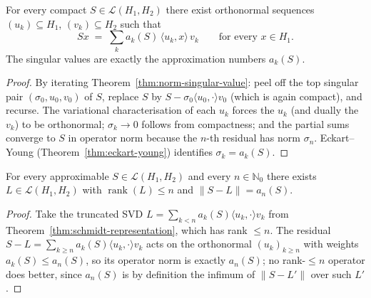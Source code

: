 \begin{theorem}
\label{thm:schmidt-representation}
\leanok
{}
For every compact $S \in \mathcal{L}(H_1, H_2)$ there exist
orthonormal sequences $(u_k) \subseteq H_1$, $(v_k) \subseteq H_2$ such
that
\[
  S x \;=\; \sum_{k} a_k(S) \, \langle u_k, x \rangle \, v_k
  \qquad \text{for every } x \in H_1.
\]
The singular values are exactly the approximation numbers $a_k(S)$.
\end{theorem}
\begin{proof}
\leanok
{}
By iterating Theorem~\ref{thm:norm-singular-value}: peel off the top
singular pair $(\sigma_0, u_0, v_0)$ of $S$, replace $S$ by
$S - \sigma_0 \langle u_0, \cdot\rangle v_0$ (which is again compact), and
recurse. The variational characterisation of each $u_k$ forces the $u_k$
(and dually the $v_k$) to be orthonormal; $\sigma_k \to 0$ follows from
compactness; and the partial sums converge to $S$ in operator norm because
the $n$-th residual has norm $\sigma_n$. Eckart--Young
(Theorem~\ref{thm:eckart-young}) identifies $\sigma_k = a_k(S)$.
\end{proof}

\begin{theorem}
\label{thm:eckart-young}
\leanok
{}
For every approximable $S \in \mathcal{L}(H_1, H_2)$ and every
$n \in \mathbb{N}_0$ there exists $L \in \mathcal{L}(H_1, H_2)$ with
$\operatorname{rank}(L) \le n$ and $\|S - L\| = a_n(S)$.
\end{theorem}
\begin{proof}
\leanok
{}
Take the truncated SVD $L = \sum_{k < n} a_k(S)\langle u_k, \cdot\rangle v_k$
from Theorem~\ref{thm:schmidt-representation}, which has rank $\le n$. The
residual $S - L = \sum_{k \ge n} a_k(S)\langle u_k, \cdot\rangle v_k$ acts on the
orthonormal $(u_k)_{k \ge n}$ with weights $a_k(S) \le a_n(S)$, so its operator
norm is exactly $a_n(S)$; no rank-$\le n$ operator does better, since $a_n(S)$
is by definition the infimum of $\|S - L'\|$ over such $L'$.
\end{proof}

